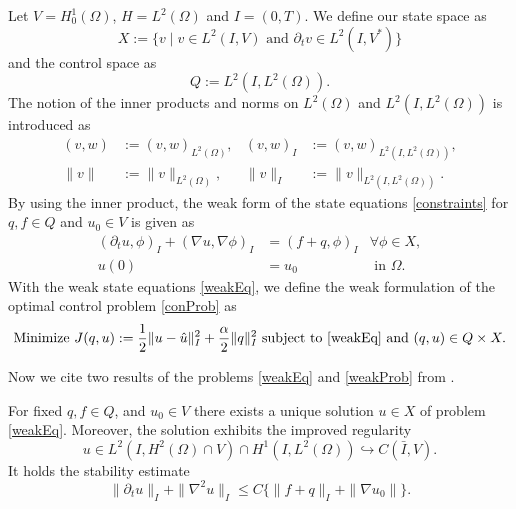 Let $V=H_0^1(\Omega)$, $H=L^2(\Omega)$ and $I=(0,T)$. We define our state space as
\begin{displaymath}
X:=\{v\mid v\in L^2(I,V)\text{ and }\partial_tv\in L^2(I,V^*)\}
\end{displaymath}
and the control space as
\begin{displaymath}
Q:=L^2(I,L^2(\Omega)).
\end{displaymath}
The notion of the inner products and norms on $L^2(\Omega)$ and $L^2(I,L^2(\Omega))$ is introduced as
\begin{align*}
(v,w)&:=(v,w)_{L^2(\Omega)},&(v,w)_I&:=(v,w)_{L^2(I,L^2(\Omega))},\\
\|v\|&:=\|v\|_{L^2(\Omega)},&\|v\|_I&:=\|v\|_{L^2(I,L^2(\Omega))}.
\end{align*}
By using the inner product, the weak form of the state equations \eqref{constraints} for $q,f\in Q$ and $u_0\in V$ is given as
\begin{equation}
\label{weakEq}
\begin{aligned}
	(\partial_tu,\phi)_I+(\nabla u,\nabla\phi)_I&=(f+q,\phi)_I&\forall\phi\in X,\\
	u(0)&=u_0&\text{ in }\Omega.
\end{aligned}
\end{equation}
With the weak state equations \eqref{weakEq}, we define the weak formulation of the optimal control problem \eqref{conProb} as
\begin{equation}
\label{weakProb}
\text{Minimize }J(q,u):=\frac{1}{2}\|u-\hat{u}\|_I^2+\frac{\alpha}{2}\|q\|_I^2\text{ subject to \eqref{weakEq} and }(q,u)\in Q\times X.
\end{equation}

Now we cite two results of the problems \eqref{weakEq} and \eqref{weakProb} from \cite{doi:10.1137/070694016}.

\begin{prop}
\label{uniqueU}
For fixed $q,f\in Q$, and $u_0\in V$ there exists a unique solution $u\in X$ of problem \eqref{weakEq}. Moreover, the solution exhibits the improved regularity
\begin{displaymath}
u\in L^2(I,H^2(\Omega)\cap V)\cap H^1(I,L^2(\Omega))\hookrightarrow C(\bar{I},V).
\end{displaymath}
It holds the stability estimate
\begin{displaymath}
\|\partial_tu\|_I+\|\nabla^2u\|_I\leq C\{\|f+q\|_I+\|\nabla u_0\|\}.
\end{displaymath}
\end{prop}

